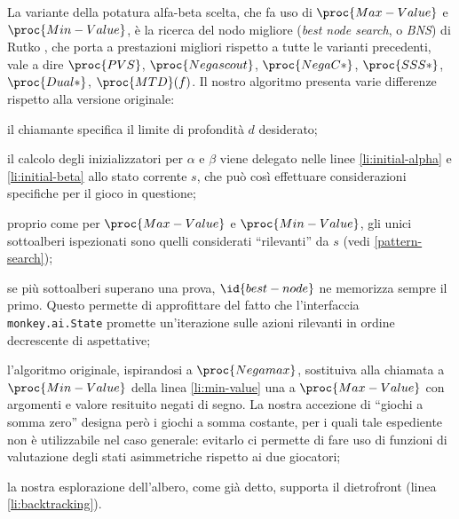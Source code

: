 \documentclass{article}
\begin{document}
La variante della potatura alfa-beta scelta, che fa uso di $\proc{Max-Value}$ e
$\proc{Min-Value}$, è la ricerca del nodo migliore (\emph{best node search}, o
\emph{BNS}) di Rutko \cite{edseul.200009163084620110101}, che porta a
prestazioni migliori rispetto a tutte le varianti precedenti, vale a dire
$\proc{PVS}$, $\proc{Negascout}$, $\proc{NegaC*}$, $\proc{SSS*}$,
$\proc{Dual*}$, $\proc{MTD}(f)$. Il nostro algoritmo presenta varie differenze
rispetto alla versione originale:
\begin{itemize}
    \item il chiamante specifica il limite di profondità $d$ desiderato;
    \item il calcolo degli inizializzatori per $\alpha$ e $\beta$ viene delegato
      nelle linee \ref{li:initial-alpha} e \ref{li:initial-beta} allo stato
      corrente $s$, che può così effettuare considerazioni specifiche per il
      gioco in questione;
    \item proprio come per $\proc{Max-Value}$ e $\proc{Min-Value}$, gli unici
      sottoalberi ispezionati sono quelli considerati ``rilevanti'' da $s$ (vedi
      \ref{pattern-search});
    \begin{sloppypar}
    \item se più sottoalberi superano una prova, $\id{best-node}$ ne memorizza
      sempre il primo. Questo permette di approfittare del fatto che
      l'interfaccia \verb!monkey.ai.State! promette un'iterazione sulle azioni
      rilevanti in ordine decrescente di aspettative;
    \end{sloppypar}
    \item l'algoritmo originale, ispirandosi a $\proc{Negamax}$, sostituiva alla
      chiamata a $\proc{Min-Value}$ della linea \ref{li:min-value} una a
      $\proc{Max-Value}$ con argomenti e valore resituito negati di segno. La
      nostra accezione di ``giochi a somma zero'' designa però i giochi a somma
      costante, per i quali tale espediente non è utilizzabile nel caso
      generale: evitarlo ci permette di fare uso di funzioni di valutazione
      degli stati asimmetriche rispetto ai due giocatori;
    \item la nostra esplorazione dell'albero, come già detto, supporta il
      dietrofront (linea \ref{li:backtracking}).
\end{itemize}
\end{document}
